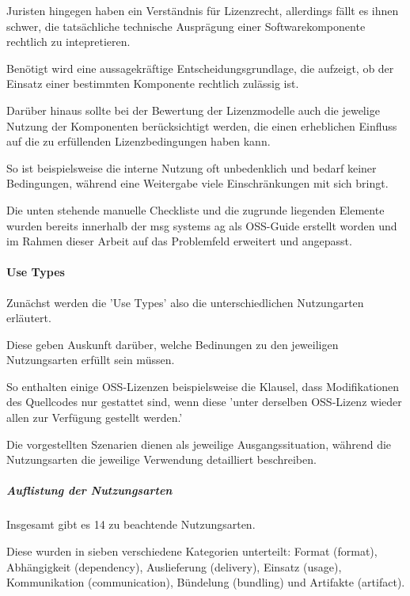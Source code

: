 Juristen hingegen haben ein Verständnis für Lizenzrecht, allerdings fällt es ihnen schwer, die tatsächliche technische Ausprägung einer Softwarekomponente rechtlich zu intepretieren.

Benötigt wird eine aussagekräftige Entscheidungsgrundlage, die aufzeigt, ob der Einsatz einer bestimmten Komponente rechtlich zulässig ist.

Darüber hinaus sollte bei der Bewertung der Lizenzmodelle auch die jewelige Nutzung der Komponenten berücksichtigt werden, die einen erheblichen Einfluss auf die zu erfüllenden Lizenzbedingungen haben kann. 

So ist beispielsweise die interne Nutzung oft unbedenklich und bedarf keiner Bedingungen, während eine Weitergabe viele Einschränkungen mit sich bringt. 

Die unten stehende manuelle Checkliste und die zugrunde liegenden Elemente wurden bereits innerhalb der msg systems ag als OSS-Guide erstellt worden und im Rahmen dieser Arbeit auf das Problemfeld erweitert und angepasst.

\paragraph{Use Types}

Zunächst werden die 'Use Types' also die unterschiedlichen Nutzungarten erläutert. 

Diese geben Auskunft darüber, welche Bedinungen zu den jeweiligen Nutzungsarten erfüllt sein müssen. 

So enthalten einige OSS-Lizenzen beispielsweise die Klausel, dass Modifikationen des Quellcodes nur gestattet sind, wenn diese 'unter derselben OSS-Lizenz wieder allen zur Verfügung gestellt werden.'

Die vorgestellten Szenarien dienen als jeweilige Ausgangssituation, während die Nutzungsarten die jeweilige Verwendung detailliert beschreiben. 

\subparagraph{Auflistung der Nutzungsarten}

Insgesamt gibt es 14 zu beachtende Nutzungsarten.

Diese wurden in sieben verschiedene Kategorien unterteilt: Format (format), Abhängigkeit (dependency), Auslieferung (delivery), Einsatz (usage), Kommunikation (communication), Bündelung (bundling) und Artifakte (artifact). 


